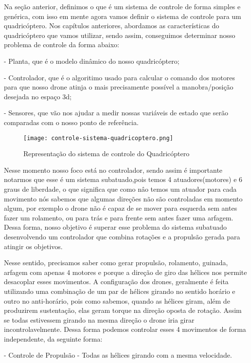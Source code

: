 Na seção anterior, definimos o que é um sistema de controle de forma simples e genérica, com isso em mente agora vamos definir o sistema de controle para um quadricóptero. Nos capítulos anteriores, abordamos as características do quadricóptero que vamos utilizar, sendo assim, conseguimos determinar nosso problema de controle da forma abaixo:

- Planta, que é o modelo dinâmico do nosso quadricóptero;

- Controlador, que é o algoritimo usado para calcular o comando dos motores para que nosso drone atinja o mais precisamente possível a manobra/posição desejada no espaço 3d;

- Sensores, que vão nos ajudar a medir nossas variáveis de estado que serão comparadas com o nosso ponto de referência.


\begin{figure}[H]
	\centering
	\texttt{[image: controle-sistema-quadricoptero.png]}
	\caption{Representação do sistema de controle do Quadricóptero}
	\centering
	\label{Representação do sistema de controle do Quadricóptero}
\end{figure}

Nesse momento nosso foco está no controlador, sendo assim é importante notarmos que esse é um sistema subatuado,pois temos 4 atuadores(motores) e 6 graus de liberdade, o que significa que como nâo temos um atuador para cada movimento nós sabemos que algumas direções não são controladas em momento algum, por exemplo o drone não é capaz de se mover para esquerda sem antes fazer um rolamento, ou para trás e para frente sem antes fazer uma arfagem. Dessa forma, nosso objetivo é superar esse problema do sistema subatuado desenvolvendo um controlador que combina rotações e a propulsão gerada para atingir os objetivos.

Nesse sentido, precisamos saber como gerar propulsão, rolamento, guinada, arfagem com apenas 4 motores e porque a direção de giro das hélices nos permite desacoplar esses movimentos.
A configuração dos drones, geralmente é feita utilizando uma combinação de um par de hélices girando no sentido horário e outro no anti-horário, pois como sabemos, quando as hélices giram, além de produzirem sustentação, elas geram torque na direção oposta de rotação. Assim se todas estivessem girando na mesma direção o drone iria girar incontrolavelmente. Dessa forma podemos controlar esses 4 movimentos de forma independente, da seguinte forma:

- Controle de Propulsão - Todas as hélices girando com a mesma velocidade.

